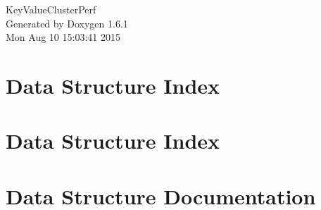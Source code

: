 \documentclass[a4paper]{book}
\begin{document}
\hypersetup{pageanchor=false}
\begin{titlepage}
\vspace*{7cm}
\begin{center}
{\Large KeyValueClusterPerf }\\
\vspace*{1cm}
{\large Generated by Doxygen 1.6.1}\\
\vspace*{0.5cm}
{\small Mon Aug 10 15:03:41 2015}\\
\end{center}
\end{titlepage}
\clearemptydoublepage
{}
\tableofcontents
\clearemptydoublepage
{}
\hypersetup{pageanchor=true}
\chapter{Data Structure Index}

\chapter{Data Structure Index}

\chapter{Data Structure Documentation}


















\printindex
\end{document}
